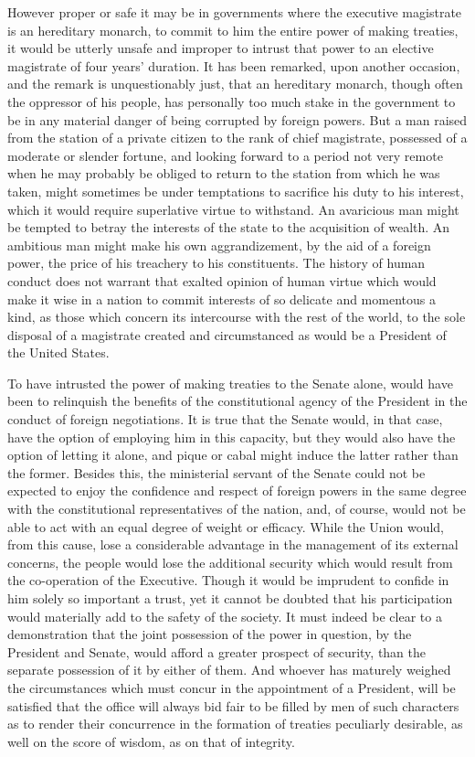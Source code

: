 However proper or safe it may be in governments where the executive magistrate is an hereditary monarch, to commit to him the entire power of making treaties, it would be utterly unsafe and improper to intrust that power to an elective magistrate of four years' duration. It has been remarked, upon another occasion, and the remark is unquestionably just, that an hereditary monarch, though often the oppressor of his people, has personally too much stake in the government to be in any material danger of being corrupted by foreign powers. But a man raised from the station of a private citizen to the rank of chief magistrate, possessed of a moderate or slender fortune, and looking forward to a period not very remote when he may probably be obliged to return to the station from which he was taken, might sometimes be under temptations to sacrifice his duty to his interest, which it would require superlative virtue to withstand. An avaricious man might be tempted to betray the interests of the state to the acquisition of wealth. An ambitious man might make his own aggrandizement, by the aid of a foreign power, the price of his treachery to his constituents. The history of human conduct does not warrant that exalted opinion of human virtue which would make it wise in a nation to commit interests of so delicate and momentous a kind, as those which concern its intercourse with the rest of the world, to the sole disposal of a magistrate created and circumstanced as would be a President of the United States.

To have intrusted the power of making treaties to the Senate alone, would have been to relinquish the benefits of the constitutional agency of the President in the conduct of foreign negotiations. It is true that the Senate would, in that case, have the option of employing him in this capacity, but they would also have the option of letting it alone, and pique or cabal might induce the latter rather than the former. Besides this, the ministerial servant of the Senate could not be expected to enjoy the confidence and respect of foreign powers in the same degree with the constitutional representatives of the nation, and, of course, would not be able to act with an equal degree of weight or efficacy. While the Union would, from this cause, lose a considerable advantage in the management of its external concerns, the people would lose the additional security which would result from the co-operation of the Executive. Though it would be imprudent to confide in him solely so important a trust, yet it cannot be doubted that his participation would materially add to the safety of the society. It must indeed be clear to a demonstration that the joint possession of the power in question, by the President and Senate, would afford a greater prospect of security, than the separate possession of it by either of them. And whoever has maturely weighed the circumstances which must concur in the appointment of a President, will be satisfied that the office will always bid fair to be filled by men of such characters as to render their concurrence in the formation of treaties peculiarly desirable, as well on the score of wisdom, as on that of integrity.

